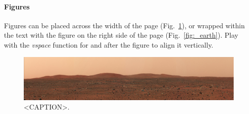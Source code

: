 \paragraph{Figures}
Figures can be placed across the width of the page (Fig.~\ref{fig:_mars}), or wrapped within the text with the figure on the right side of the page (Fig.~\ref{fig:_earth}). Play with the \emph{vspace} function for and after the figure to align it vertically.

\begin{figure}[thb]
 \noindent\small\includegraphics[width=\textwidth]{figures/_mars.jpg}
 \caption{<CAPTION>.}
 \vspace{-1em}
 \label{fig:_mars}
\end{figure}
